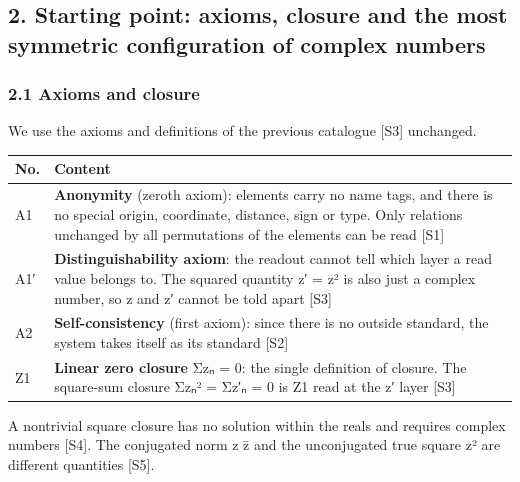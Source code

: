 \documentclass[
  a4paper,
]{article}
\newcounter{none} %
\begin{document}
\subsection{2. Starting point: axioms, closure and the most symmetric
configuration of complex
numbers}\label{starting-point-axioms-closure-and-the-most-symmetric-configuration-of-complex-numbers}

\subsubsection{2.1 Axioms and closure}\label{axioms-and-closure}

We use the axioms and definitions of the previous catalogue {[}S3{]}
unchanged.

{\def\LTcaptype{none} %
\begin{longtable}[]{@{}
  >{\raggedright\arraybackslash}p{}
  >{\raggedright\arraybackslash}p{}@{}}
\toprule\noalign{}
\begin{minipage}[b]{\linewidth}\raggedright
No.
\end{minipage} & \begin{minipage}[b]{\linewidth}\raggedright
Content
\end{minipage} \\
\midrule\noalign{}
\endhead
\bottomrule\noalign{}
\endlastfoot
A1 & \textbf{Anonymity} (zeroth axiom): elements carry no name tags, and
there is no special origin, coordinate, distance, sign or type. Only
relations unchanged by all permutations of the elements can be read
{[}S1{]} \\
A1′ & \textbf{Distinguishability axiom}: the readout cannot tell which
layer a read value belongs to. The squared quantity z′ = z² is also just
a complex number, so z and z′ cannot be told apart {[}S3{]} \\
A2 & \textbf{Self-consistency} (first axiom): since there is no outside
standard, the system takes itself as its standard {[}S2{]} \\
Z1 & \textbf{Linear zero closure} Σzₙ = 0: the single definition of
closure. The square-sum closure Σzₙ² = Σz′ₙ = 0 is Z1 read at the z′
layer {[}S3{]} \\
\end{longtable}
}

A nontrivial square closure has no solution within the reals and
requires complex numbers {[}S4{]}. The conjugated norm z z̄ and the
unconjugated true square z² are different quantities {[}S5{]}.
\end{document}
